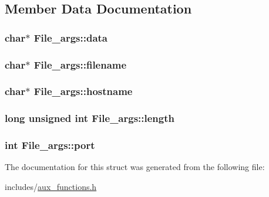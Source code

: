\subsection{Member Data Documentation}
\hypertarget{struct_file__args_a0fda96130bd2c0d56e9508b37fb822a2}{
\subsubsection[{data}]{\setlength{\rightskip}{0pt plus 5cm}char$\ast$ File\-\_\-args\-::data}}\label{struct_file__args_a0fda96130bd2c0d56e9508b37fb822a2}
\hypertarget{struct_file__args_ad24dfcb255f29ee677793a0051c7336b}{
\subsubsection[{filename}]{\setlength{\rightskip}{0pt plus 5cm}char$\ast$ File\-\_\-args\-::filename}}\label{struct_file__args_ad24dfcb255f29ee677793a0051c7336b}
\hypertarget{struct_file__args_a9aa177aea3a099397a09131a92f30115}{
\subsubsection[{hostname}]{\setlength{\rightskip}{0pt plus 5cm}char$\ast$ File\-\_\-args\-::hostname}}\label{struct_file__args_a9aa177aea3a099397a09131a92f30115}
\hypertarget{struct_file__args_a3168e8734e7ad263d88a6da49b4aff20}{
\subsubsection[{length}]{\setlength{\rightskip}{0pt plus 5cm}long unsigned int File\-\_\-args\-::length}}\label{struct_file__args_a3168e8734e7ad263d88a6da49b4aff20}
\hypertarget{struct_file__args_a83e78eb2ebacdc7e63eca61d1340fa61}{
\subsubsection[{port}]{\setlength{\rightskip}{0pt plus 5cm}int File\-\_\-args\-::port}}\label{struct_file__args_a83e78eb2ebacdc7e63eca61d1340fa61}


The documentation for this struct was generated from the following file\-:\begin{DoxyCompactItemize}
\item 
includes/\hyperlink{aux__functions_8h}{aux\-\_\-functions.\-h}\end{DoxyCompactItemize}
